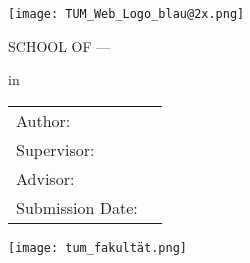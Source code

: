 \begin{titlepage}
  \centering

  \texttt{[image: TUM\_Web\_Logo\_blau@2x.png]}

  \vspace{5mm}
  {\huge\MakeUppercase{School of \getSchool{} --- \getFaculty{}} \par}

  \vspace{5mm}
  {\large\MakeUppercase{\getUniversity{}} \par}

  \vspace{10mm}
  {\Large \getDoctype{} in \getDegree{} \par}

  \vspace{7mm}
  {\huge\bfseries \getTitle{} \par}

  \vspace{5mm}
  {\huge\bfseries \foreignlanguage{ngerman}{\getTitleGer{}} \par}

  \vspace{7mm}
  \begin{tabular}{l l}
    Author:          & \getAuthor{}         \\
    Supervisor:      & \getSupervisor{}     \\
    Advisor:         & \getAdvisor{}        \\
    Submission Date: & \getSubmissionDate{} \\
  \end{tabular}

  \vfill{}
  \texttt{[image: tum\_fakultät.png]}
\end{titlepage}
